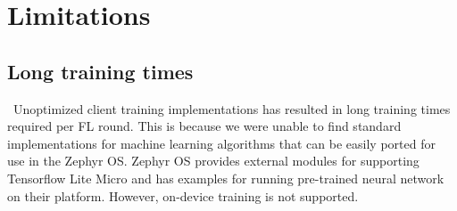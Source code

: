 \documentclass[12pt]{article}
\begin{document}
\section{Limitations}
\subsection{Long training times}\
Unoptimized client training implementations has resulted in long training times required per FL
round. This is because we were unable to find standard implementations for machine learning
algorithms that can be easily ported for use in the Zephyr OS. Zephyr OS provides external modules
for supporting Tensorflow Lite Micro\cite{} and has examples for running pre-trained neural network
on their platform. However, on-device training is not supported\cite{}.
\end{document}
